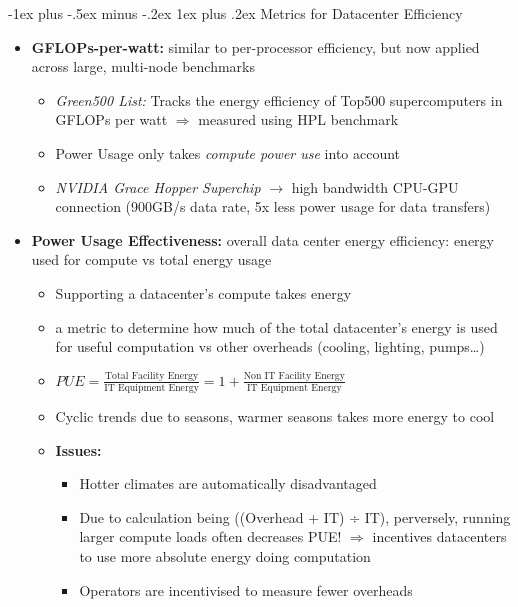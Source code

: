 \documentclass[10pt,landscape]{article}
\makeatletter
\newcommand{\subsubsubsection}{\@startsection{subsubsection}{3}{0mm}%
                                {-1ex plus -.5ex minus -.2ex}%
                                {1ex plus .2ex}%
                                {\normalfont\scriptsize\bfseries}}
\makeatother
\begin{document}
\begin{multicols*}{3}
\subsubsubsection{Metrics for Datacenter Efficiency}
\begin{itemize}[topsep=0pt,noitemsep,wide=0pt, leftmargin=\dimexpr{} + 2\relax]
    \item \textbf{GFLOPs-per-watt:} similar to per-processor efficiency, but now applied across large, multi-node benchmarks
    \begin{itemize}[topsep=0pt,noitemsep,wide=0pt, leftmargin=\dimexpr{} + 2\relax]
        \item \textit{Green500 List:} Tracks the energy efficiency of Top500 supercomputers in GFLOPs per watt $\Rightarrow$ measured using HPL benchmark
        \item Power Usage only takes \textit{compute power use} into account
        \item \textit{NVIDIA Grace Hopper Superchip} $\rightarrow$ high bandwidth CPU-GPU connection (900GB/s data rate, 5x less power usage for data transfers)
    \end{itemize}
    \item \textbf{Power Usage Effectiveness:} overall data center energy efficiency: energy used for compute vs total energy usage
    \begin{itemize}[topsep=0pt,noitemsep,wide=0pt, leftmargin=\dimexpr{} + 2\relax]
        \item Supporting a datacenter’s compute takes energy
        \item a metric to determine how much of the total datacenter’s energy is used for useful computation vs other overheads (cooling, lighting, pumps…)
        \item $PUE = \frac{\text{Total Facility Energy}}{\text{IT Equipment Energy}} = 1 + \frac{\text{Non IT Facility Energy}}{\text{IT Equipment Energy}}$
        \item Cyclic trends due to seasons, warmer seasons takes more energy to cool
        \item \textbf{Issues:}
        \begin{itemize}[topsep=0pt,noitemsep,wide=0pt, leftmargin=\dimexpr{} + 2\relax]
            \item Hotter climates are automatically disadvantaged
            \item Due to calculation being ((Overhead + IT) ÷ IT), perversely, running larger compute loads often decreases PUE! $\Rightarrow$ incentives datacenters to use more absolute energy doing computation
            \item Operators are incentivised to measure fewer overheads

\end{itemize}
\end{itemize}
\end{itemize}
\end{multicols*}
\end{document}
